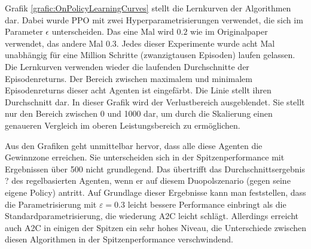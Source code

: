Grafik \ref{grafic:OnPolicyLearningCurves} stellt die Lernkurven der Algorithmen dar.
Dabei wurde PPO mit zwei Hyperparametrisierungen verwendet, die sich im Parameter $\epsilon$ unterscheiden.
Das eine Mal wird $0.2$ wie im Originalpaper verwendet, das andere Mal $0.3$.
Jedes dieser Experimente wurde acht Mal unabhängig für eine Million Schritte (zwanzigtausen Episoden) laufen gelassen.
Die Lernkurven verwenden wieder die laufenden Durchschnitte der Episodenreturns.
Der Bereich zwischen maximalem und minimalem Episodenreturns dieser acht Agenten ist eingefärbt.
Die Linie stellt ihren Durchschnitt dar.
In dieser Grafik wird der Verlustbereich ausgeblendet.
Sie stellt nur den Bereich zwischen 0 und 1000 dar, um durch die Skalierung einen genaueren Vergleich im oberen Leistungsbereich zu ermöglichen.

Aus den Grafiken geht unmittelbar hervor, dass alle diese Agenten die Gewinnzone erreichen.
Sie unterscheiden sich in der Spitzenperformance mit Ergebnissen über 500 nicht grundlegend.
Das übertrifft das Durchschnittsergebnis ? des regelbasierten Agenten, wenn er auf diesem Duopolszenario (gegen seine eigene Policy) antritt.
Auf Grundlage dieser Ergebnisse kann man feststellen, dass die Parametrisierung mit $\varepsilon=0.3$ leicht bessere Performance einbringt als die Standardparametrisierung, die wiederung A2C leicht schlägt.
Allerdings erreicht auch A2C in einigen der Spitzen ein sehr hohes Niveau, die Unterschiede zwischen diesen Algorithmen in der Spitzenperformance verschwindend.

